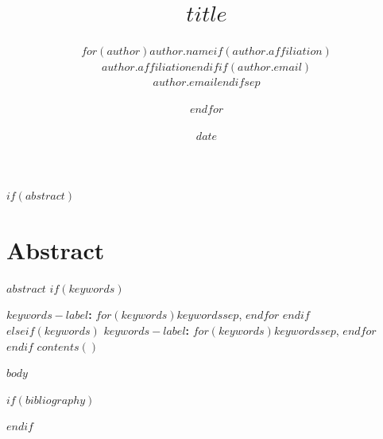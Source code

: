 \documentclass[$for(classoption)$$classoption$$sep$,$endfor$]{book}
\title{$title$}
\author{$for(author)$$author.name$$if(author.affiliation)$\\{\small $author.affiliation$}$endif$$if(author.email)$\\{\small\texttt{$author.email$}}$endif$$sep$ \and $endfor$}
\date{$date$}
\providecommand\abstractname{Abstract}
\begin{document}
\frontmatter
\maketitle
$if(abstract)$
\chapter*{\abstractname}
$abstract$
$if(keywords)$

\medskip\noindent\textbf{$keywords-label$:} $for(keywords)$$keywords$$sep$, $endfor$
$endif$
$elseif(keywords)$
\noindent\textbf{$keywords-label$:} $for(keywords)$$keywords$$sep$, $endfor$
$endif$
$contents()$
\mainmatter

$body$

$if(bibliography)$


$endif$
\end{document}
